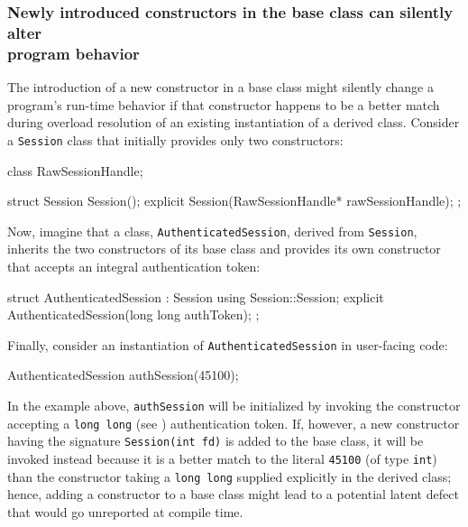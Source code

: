 \subsubsection[Newly introduced constructors in the base class can silently alter program behavior]{Newly introduced constructors in the base class can silently alter\\[0.5ex] program behavior}\label{newly-introduced-constructors-in-the-base-class-can-silently-alter-program-behavior}

The introduction of a new constructor in a base class might silently
change a program's run-time behavior if that constructor happens to be a
better match during overload resolution of an existing instantiation of
a derived class. Consider a \lstinline!Session! class that initially provides only two constructors:

\begin{emcppshiddenlisting}[emcppsbatch=e9]
class RawSessionHandle;
\end{emcppshiddenlisting}
\begin{emcppslisting}[emcppsbatch=e9]
struct Session
{
    Session();
    explicit Session(RawSessionHandle* rawSessionHandle);
};
\end{emcppslisting}
    
\noindent Now, imagine that a class, \lstinline!AuthenticatedSession!, derived from
\lstinline!Session!, inherits the two constructors of its base class and provides its own constructor that accepts an integral
authentication token:

\begin{emcppslisting}[emcppsbatch=e9]
struct AuthenticatedSession : Session
{
    using Session::Session;
    explicit AuthenticatedSession(long long authToken);
};
\end{emcppslisting}
    
\noindent Finally, consider an instantiation of \lstinline!AuthenticatedSession! in
user-facing code:

\begin{emcppslisting}[emcppsbatch=e9]
AuthenticatedSession authSession(45100);
\end{emcppslisting}
    
\noindent In the example above, \lstinline!authSession! will be initialized by
invoking the constructor accepting a \lstinline!long!~\lstinline!long! (see ) 
authentication token. If, however, a new
constructor having the signature \lstinline!Session(int!~\lstinline!fd)! is added to the
base class, it will be invoked instead because it is a better match to the
literal \lstinline!45100! (of type \lstinline!int!) than the constructor
taking a \lstinline!long!~\lstinline!long! supplied explicitly in the derived
class; hence, adding a constructor to a base class might lead to a
potential latent defect that would go unreported at compile
time.

